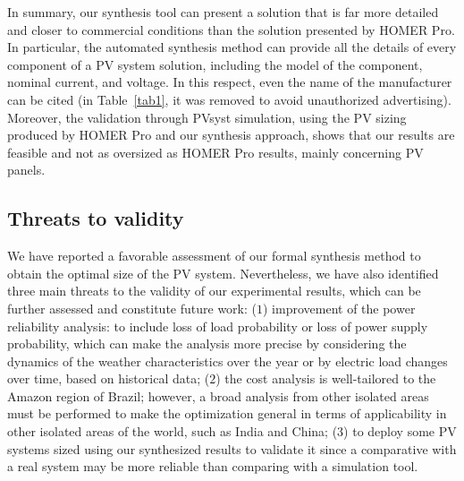 \documentclass[journal]{IEEEtran}
\begin{document}
In summary, our synthesis tool can present a solution that is far more detailed and closer to commercial conditions than the solution presented by HOMER Pro. In particular, the automated synthesis method can provide all the details of every component of a PV system solution, including the model of the component, nominal current, and voltage. In this respect, even the name of the manufacturer can be cited (in Table~\ref{tab1}, it was removed to avoid unauthorized advertising). Moreover, the validation through PVsyst simulation, using the PV sizing produced by HOMER Pro and our synthesis approach, shows that our results are feasible and not as oversized as HOMER Pro results, mainly concerning PV panels.

\subsection{Threats to validity}
We have reported a favorable assessment of our formal synthesis method to obtain the optimal size of the PV system. Nevertheless, we have also identified three main threats to the validity of our experimental results, which can be further assessed and constitute future work: ($1$) improvement of the power reliability analysis: to include loss of load probability or loss of power supply probability, which can make the analysis more precise by considering the dynamics of the weather characteristics over the year or by electric load changes over time, based on historical data; ($2$) the cost analysis is well-tailored to the Amazon region of Brazil; however, a broad analysis from other isolated areas must be performed to make the optimization general in terms of applicability in other isolated areas of the world, such as India and China; ($3$) to deploy some PV systems sized using our synthesized results to validate it since a comparative with a real system may be more reliable than comparing with a simulation tool.

\end{document}
